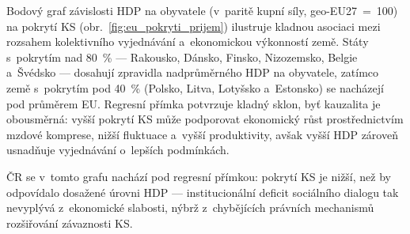 
Bodový graf závislosti \ac{HDP} na obyvatele (v~paritě kupní síly, \acs{geo-EU27}~=~100) na pokrytí \ac{KS} (obr.~\ref{fig:eu_pokryti_prijem}) ilustruje kladnou asociaci mezi rozsahem kolektivního vyjednávání a~ekonomickou výkonností země.
Státy s~pokrytím nad \SI{80}{\percent} --- Rakousko, Dánsko, Finsko, Nizozemsko, Belgie a~Švédsko --- dosahují zpravidla nadprůměrného \ac{HDP} na obyvatele, zatímco země s~pokrytím pod \SI{40}{\percent} (Polsko, Litva, Lotyšsko a~Estonsko) se nacházejí pod průměrem \ac{EU}.
Regresní přímka potvrzuje kladný sklon, byť kauzalita je obousměrná: vyšší pokrytí \ac{KS} může podporovat ekonomický růst prostřednictvím mzdové komprese, nižší fluktuace a~vyšší produktivity, avšak vyšší \ac{HDP} zároveň usnadňuje vyjednávání o~lepších podmínkách.

ČR se v~tomto grafu nachází pod regresní přímkou: pokrytí \ac{KS} je nižší, než by odpovídalo dosažené úrovni \ac{HDP} --- institucionální deficit sociálního dialogu tak nevyplývá z~ekonomické slabosti, nýbrž z~chybějících právních mechanismů rozšiřování závaznosti \ac{KS}.


